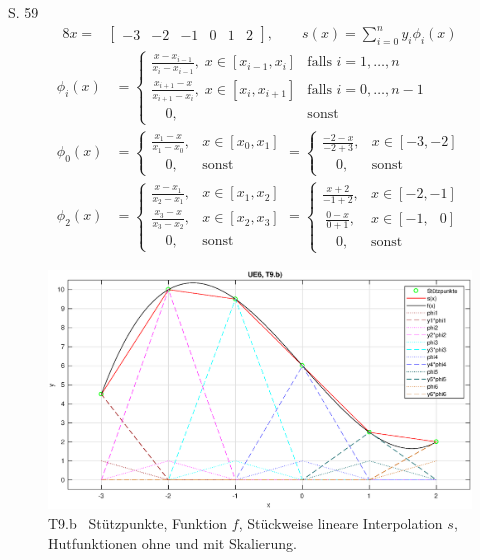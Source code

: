 \documentclass[10pt,a4paper]{article}
\begin{document}
	S. 59
	\begin{alignat*}{8}
	x =& \begin{bmatrix}-3 & -2 & -1 &0& 1& 2 \end{bmatrix}, \qquad s(x)=\sum\limits_{i=0}^{n}y_i\phi_i(x)
	\end{alignat*}
	\begin{align*}
	\phi_i(x) &= \begin{cases}
	\frac{x-x_{i-1}}{x_i-x_{i-1}}, \; x \in [x_{i-1}, x_i] & \text{falls } i=1,\dots, n\\
	\frac{x_{i+1}-x}{x_{i+1}-x_i}, \; x \in [x_i, x_{i+1}] & \text{falls } i=0,\dots, n-1\\
	\quad 0, & \text{sonst}
	\end{cases} \\
	\phi_0(x) &= \begin{cases}
	\frac{x_{1}-x}{x_{1}-x_0}, & x \in [x_0, x_{1}] \\
	\quad\! 0, & \text{sonst}
	\end{cases} =
	\begin{cases}
	\frac{-2-x}{-2+3}, & x \in [-3, -2] \\
	\quad\! 0, & \text{sonst}
	\end{cases}
	\\
	\phi_2(x) &= \begin{cases}
	\frac{x-x_{1}}{x_2-x_{1}}, & x \in [x_{1}, x_2] \\
	\frac{x_{3}-x}{x_{3}-x_2}, & x \in [x_2, x_{3}] \\
	\quad 0, & \text{sonst}
	\end{cases}
	= \begin{cases}
	\frac{x+2}{-1+2}, & x \in [-2, -1]\\
	\:\frac{0-x}{0+1}, & x \in [-1, \;\;\,0] \\
	\quad 0, & \text{sonst}
	\end{cases}
	\end{align*}
	\begin{figure}[htbp]
		\centering
		\includegraphics[width=1.0\textwidth]{T9b}
		\caption{T9.b \, Stützpunkte, Funktion $f$, Stückweise lineare Interpolation $s$, Hutfunktionen ohne und mit Skalierung.}
	\end{figure}
	
\end{document}
